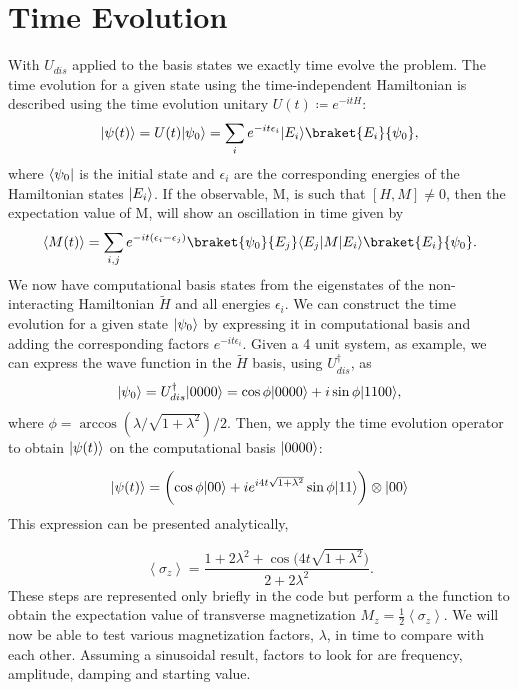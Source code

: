 \documentclass[12pt]{article}
\newcommand*{\eu}{e}
\DeclarePairedDelimiter{\bra}{\langle}{\rvert}
\DeclarePairedDelimiter{\ket}{\lvert}{\rangle}
\begin{document}
  \section{Time Evolution}
  With $U_{dis}$ applied to the basis states we exactly time evolve the problem. The time evolution for a given state using the time-independent Hamiltonian is described using the time evolution unitary $U(t) \coloneqq \eu^{-itH}$:
  \begin{equation}
    \ket{\psi(t)} = U(t)\ket{\psi_{0}} = \sum_{i} \eu^{-it\epsilon_{i}} \ket{E_{i}}\braket{E_{i}}{\psi_{0}},
  \end{equation}
  where $\bra{\psi_{0}}$ is the initial state and $\epsilon_{i}$ are the corresponding energies of the Hamiltonian states $\ket{E_{i}}$. If the observable, M, is such that $[H,M] \neq 0$, then the expectation value of M, will show an oscillation in time given by
  \begin{equation}
    \left\langle M(t)\right\rangle = \sum_{i,j}\eu^{-it(\epsilon_{i}-\epsilon_{j})}\braket{\psi_{0}}{E_{j}}\bra{E_{j}}M\ket{E_{i}}\braket{E_{i}}{\psi_{0}}.
  \end{equation}
  We now have computational basis states from the eigenstates of the non-interacting Hamiltonian $\tilde{H}$ and all energies $\epsilon_{i}$. We can construct the time evolution for a given state $\ket{\psi_{0}}$ by expressing it in computational basis and adding the corresponding factors $\eu^{-it\epsilon_{i}}$. Given a 4 unit system, as example, we can express the wave function in the $\tilde{H}$ basis, using $U_{dis}^{\dagger}$, as
  \begin{equation}
    \ket{\psi_{0}} = U_{dis}^{\dagger}\ket{0000} = \cos \phi\ket{0000} + i\sin \phi\ket{1100},
  \end{equation}
  where $\phi = \arccos(\lambda/\sqrt{1+\lambda ^2})/2$. Then, we apply the time evolution operator to obtain $\ket{\psi (t)}$ on the computational basis $\ket{0000}$:

  \begin{equation}
    \ket{\psi (t)} = \biggl( \cos \phi\ket{00} + i\eu^{i4t\sqrt{1+\lambda ^2}} \sin \phi \ket{11} \biggr) \otimes \ket{00}
  \end{equation}
  This expression can be presented analytically,

  \begin{equation}
    \left\langle \sigma_{z} \right\rangle = \frac{1 + 2\lambda ^2 + \cos \biggl( 4t\sqrt{1 + \lambda ^2}\biggr)}{2 + 2\lambda ^2}.
  \end{equation}
  These steps are represented only briefly in the code but perform a the function to obtain the expectation value of transverse magnetization $M_{z} = \frac{1}{2}\left\langle \sigma_{z}\right\rangle$. We will now be able to test various magnetization factors, $\lambda$, in time to compare with each other. Assuming a sinusoidal result, factors to look for are frequency, amplitude, damping and starting value.
\end{document}
